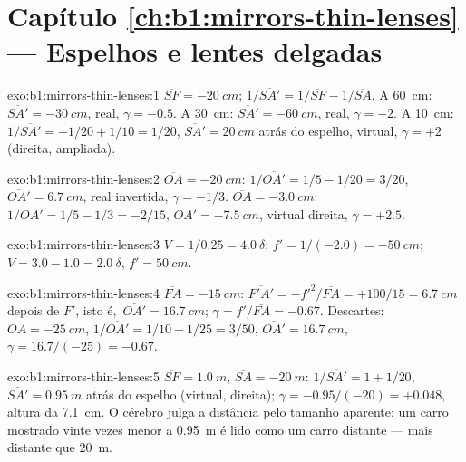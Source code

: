 \section*{Capítulo \ref{ch:b1:mirrors-thin-lenses} --- Espelhos e lentes delgadas}

\begin{solution}{exo:b1:mirrors-thin-lenses:1}
$\overline{SF} = \qty{-20}{cm}$; $1/\overline{SA'} = 1/\overline{SF} -
1/\overline{SA}$. A \qty{60}{cm}: $\overline{SA'} = \qty{-30}{cm}$,
real, $\gamma = -0.5$. A \qty{30}{cm}: $\overline{SA'} = \qty{-60}{cm}$,
real, $\gamma = -2$. A \qty{10}{cm}: $1/\overline{SA'} = -1/20 + 1/10
= 1/20$, $\overline{SA'} = \qty{+20}{cm}$ atrás do espelho, virtual,
$\gamma = +2$ (direita, ampliada).
\end{solution}

\begin{solution}{exo:b1:mirrors-thin-lenses:2}
$\overline{OA} = \qty{-20}{cm}$: $1/\overline{OA'} = 1/5 - 1/20 = 3/20$,
$\overline{OA'} = \qty{+6.7}{cm}$, real invertida, $\gamma = -1/3$.
$\overline{OA} = \qty{-3.0}{cm}$: $1/\overline{OA'} = 1/5 - 1/3 = -2/15$,
$\overline{OA'} = \qty{-7.5}{cm}$, virtual direita, $\gamma = +2.5$.
\end{solution}

\begin{solution}{exo:b1:mirrors-thin-lenses:3}
$V = 1/0.25 = \qty{+4.0}{\delta}$; $f' = 1/(-2.0) = \qty{-50}{cm}$;
$V = 3.0 - 1.0 = \qty{+2.0}{\delta}$, $f' = \qty{50}{cm}$.
\end{solution}

\begin{solution}{exo:b1:mirrors-thin-lenses:4}
$\overline{FA} = \qty{-15}{cm}$: $\overline{F'A'} = -f'^2/\overline{FA}
= +100/15 = \qty{6.7}{cm}$ depois de $F'$, isto é,\ $\overline{OA'} = \qty{16.7}{cm}$;
$\gamma = f'/\overline{FA} = -0.67$. Descartes: $\overline{OA} =
\qty{-25}{cm}$, $1/\overline{OA'} = 1/10 - 1/25 = 3/50$,
$\overline{OA'} = \qty{16.7}{cm}$, $\gamma = 16.7/(-25) = -0.67$.
\end{solution}

\begin{solution}{exo:b1:mirrors-thin-lenses:5}
$\overline{SF} = \qty{+1.0}{m}$, $\overline{SA} = \qty{-20}{m}$:
$1/\overline{SA'} = 1 + 1/20$, $\overline{SA'} = \qty{0.95}{m}$ atrás
do espelho (virtual, direita); $\gamma = -0.95/(-20) = +0.048$, altura
da  \qty{7.1}{cm}. O cérebro julga a distância pelo tamanho aparente: um
carro mostrado vinte vezes menor a \qty{0.95}{m} é lido como um carro
distante --- mais distante que \qty{20}{m}.
\end{solution}


